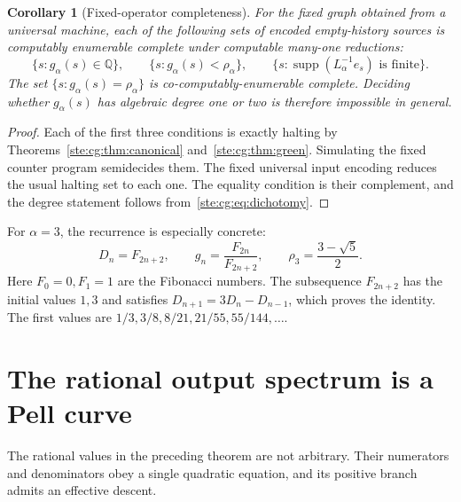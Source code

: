 \documentclass[11pt,letterpaper]{article}
\newtheorem{corollary}[theorem]{Corollary}
\theoremstyle{definition}
\theoremstyle{remark}
\newcommand{\Q}{\mathbb Q}
\DeclareMathOperator{\supp}{supp}
\begin{document}
\begin{corollary}[Fixed-operator completeness]\label{ste:cg:cor:complete}
For the fixed graph obtained from a universal machine, each of the following
sets of encoded empty-history sources is computably enumerable complete
under computable many-one reductions:
\[
 \{s:g_\alpha(s)\in\Q\},\qquad
 \{s:g_\alpha(s)<\rho_\alpha\},\qquad
 \{s:\supp(L_\alpha^{-1}e_s)\text{ is finite}\}.
\]
The set $\{s:g_\alpha(s)=\rho_\alpha\}$ is co-computably-enumerable
complete. Deciding whether $g_\alpha(s)$ has algebraic degree one or two
is therefore impossible in general.
\end{corollary}
\begin{proof}
Each of the first three conditions is exactly halting by
Theorems~\ref{ste:cg:thm:canonical} and~\ref{ste:cg:thm:green}. Simulating the fixed
counter program semidecides them. The fixed universal input encoding
reduces the usual halting set to each one. The equality condition is their
complement, and the degree statement follows from~\eqref{ste:cg:eq:dichotomy}.
\end{proof}

For $\alpha=3$, the recurrence is especially concrete:
\begin{equation}\label{ste:cg:eq:fibonacci}
 D_n=F_{2n+2},\qquad g_n=\frac{F_{2n}}{F_{2n+2}},\qquad
 \rho_3=\frac{3-\sqrt5}{2}.
\end{equation}
Here $F_0=0,F_1=1$ are the Fibonacci numbers. The subsequence
$F_{2n+2}$ has the initial values $1,3$ and satisfies
$D_{n+1}=3D_n-D_{n-1}$, which proves the identity. The first values are
$1/3,3/8,8/21,21/55,55/144,\ldots$.

\section{The rational output spectrum is a Pell curve}\label{ste:cg:sec:pell}
The rational values in the preceding theorem are not arbitrary. Their
numerators and denominators obey a single quadratic equation, and its
positive branch admits an effective descent.
\end{document}
